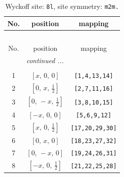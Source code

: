 \documentclass[fleqn,8pt]{jsarticle}
\begin{document}
\begin{longtable}{ccc}
\caption{Wyckoff site: {\tt 8l}, site symmetry: {\tt m2m.}}
 \\
 \hline \hline
No. & position & mapping \\ \hline \endfirsthead

\multicolumn{2}{l}{\tablename\ \thetable{}} \\
 \hline \hline
No. & position & mapping \\ \hline \endhead

 \hline \hline
\multicolumn{2}{r}{\footnotesize\it continued ...} \\ \endfoot

 \hline \hline
\multicolumn{2}{r}{} \\ \endlastfoot

1 & $\left[ x,\, 0,\, 0 \right]$ & {\tt [1,4,13,14]} \\ \hline
2 & $\left[ 0,\, x,\, \frac{1}{2} \right]$ & {\tt [2,7,11,16]} \\ \hline
3 & $\left[ 0,\, - x,\, \frac{1}{2} \right]$ & {\tt [3,8,10,15]} \\ \hline
4 & $\left[ - x,\, 0,\, 0 \right]$ & {\tt [5,6,9,12]} \\ \hline
5 & $\left[ x,\, 0,\, \frac{1}{2} \right]$ & {\tt [17,20,29,30]} \\ \hline
6 & $\left[ 0,\, x,\, 0 \right]$ & {\tt [18,23,27,32]} \\ \hline
7 & $\left[ 0,\, - x,\, 0 \right]$ & {\tt [19,24,26,31]} \\ \hline
8 & $\left[ - x,\, 0,\, \frac{1}{2} \right]$ & {\tt [21,22,25,28]} \\
\end{longtable}
\renewcommand{\arraystretch}{1.2}
\end{document}
